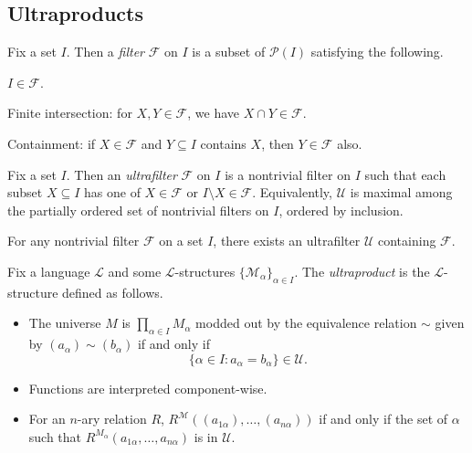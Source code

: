 \documentclass{article}
\begin{document}
\subsection{Ultraproducts}
\begin{definition}[filter]
	Fix a set $I$. Then a \textit{filter} $\mathcal F$ on $I$ is a subset of $\mathcal P(I)$ satisfying the following.
	\begin{listalph}
		\item $I\in\mathcal F$.
		\item Finite intersection: for $X,Y\in\mathcal F$, we have $X\cap Y\in\mathcal F$.
		\item Containment: if $X\in\mathcal F$ and $Y\subseteq I$ contains $X$, then $Y\in\mathcal F$ also.
	\end{listalph}
\end{definition}
\begin{definition}[ultrafilter]
	Fix a set $I$. Then an \textit{ultrafilter} $\mathcal F$ on $I$ is a nontrivial filter on $I$ such that each subset $X\subseteq I$ has one of $X\in\mathcal F$ or $I\setminus X\in\mathcal F$. Equivalently, $\mathcal U$ is maximal among the partially ordered set of nontrivial filters on $I$, ordered by inclusion.
\end{definition}
\begin{remark}
	For any nontrivial filter $\mathcal F$ on a set $I$, there exists an ultrafilter $\mathcal U$ containing $\mathcal F$.
\end{remark}
\begin{definition}[ultraproduct]
	Fix a language $\mathcal L$ and some $\mathcal L$-structures $\{\mathcal M_\alpha\}_{\alpha\in I}$. The \textit{ultraproduct} is the $\mathcal L$-structure defined as follows.
	\begin{itemize}
		\item The universe $M$ is $\prod_{\alpha\in I}M_\alpha$ modded out by the equivalence relation $\sim$ given by $(a_\alpha)\sim(b_\alpha)$ if and only if
		\[\{\alpha\in I:a_\alpha=b_\alpha\}\in\mathcal U.\]
		\item Functions are interpreted component-wise.
		\item For an $n$-ary relation $R$, $R^\mathcal M((a_{1\alpha}),\ldots,(a_{n\alpha}))$ if and only if the set of $\alpha$ such that $R^{M_\alpha}(a_{1\alpha},\ldots,a_{n\alpha})$ is in $\mathcal U$.
	\end{itemize}
\end{definition}
\end{document}
